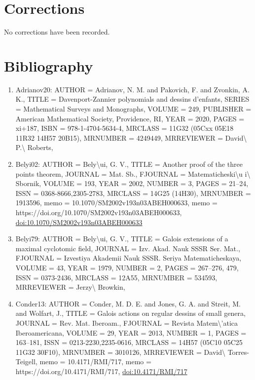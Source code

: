 \documentclass[11pt]{article}
\begin{document}
\section*{Corrections}
No corrections have been recorded.

\section*{Bibliography}
\begin{enumerate}[leftmargin=*]
  \item Adrianov20: AUTHOR = Adrianov, N. M. and Pakovich, F. and Zvonkin, A. K., TITLE = Davenport-Zannier polynomials and dessins d'enfants, SERIES = Mathematical Surveys and Monographs, VOLUME = 249, PUBLISHER = American Mathematical Society, Providence, RI, YEAR = 2020, PAGES = xi+187, ISBN = 978-1-4704-5634-4, MRCLASS = 11G32 (05Cxx 05E18 11R32 14H57 20B15), MRNUMBER = 4249449, MRREVIEWER = David\textbackslash{} P.\textbackslash{} Roberts,
  \item Belyi02: AUTHOR = Bely\textbackslash{}ui, G. V., TITLE = Another proof of the three points theorem, JOURNAL = Mat. Sb., FJOURNAL = Matematicheski\textbackslash{}u i\textbackslash{} Sbornik, VOLUME = 193, YEAR = 2002, NUMBER = 3, PAGES = 21--24, ISSN = 0368-8666,2305-2783, MRCLASS = 14G25 (14H30), MRNUMBER = 1913596, memo = 10.1070/SM2002v193n03ABEH000633, memo = https://doi.org/10.1070/SM2002v193n03ABEH000633, \href{https://doi.org/10.1070/SM2002v193n03ABEH000633}{doi:10.1070/SM2002v193n03ABEH000633}
  \item Belyi79: AUTHOR = Bely\textbackslash{}ui, G. V., TITLE = Galois extensions of a maximal cyclotomic field, JOURNAL = Izv. Akad. Nauk SSSR Ser. Mat., FJOURNAL = Izvestiya Akademii Nauk SSSR. Seriya Matematicheskaya, VOLUME = 43, YEAR = 1979, NUMBER = 2, PAGES = 267--276, 479, ISSN = 0373-2436, MRCLASS = 12A55, MRNUMBER = 534593, MRREVIEWER = Jerzy\textbackslash{} Browkin,
  \item Conder13: AUTHOR = Conder, M. D. E. and Jones, G. A. and Streit, M. and Wolfart, J., TITLE = Galois actions on regular dessins of small genera, JOURNAL = Rev. Mat. Iberoam., FJOURNAL = Revista Matem\textbackslash{}'atica Iberoamericana, VOLUME = 29, YEAR = 2013, NUMBER = 1, PAGES = 163--181, ISSN = 0213-2230,2235-0616, MRCLASS = 14H57 (05C10 05C25 11G32 30F10), MRNUMBER = 3010126, MRREVIEWER = David\textbackslash{} Torres-Teigell, memo = 10.4171/RMI/717, memo = https://doi.org/10.4171/RMI/717, \href{https://doi.org/10.4171/RMI/717}{doi:10.4171/RMI/717}

\end{enumerate}
\end{document}
